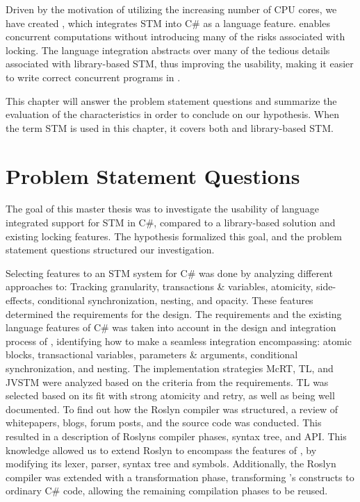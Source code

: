 \makeatletter {}\makeatother
{}
Driven by the motivation of utilizing the increasing number of \ac{CPU} cores, we have created \stmname, which integrates \ac{STM} into C\# as a language feature. \stmname enables concurrent computations without introducing many of the risks associated with locking. The language integration abstracts over many of the tedious details associated with library-based \ac{STM}, thus improving the usability, making it easier to write correct concurrent programs in \stmname.

This chapter will answer the problem statement questions and summarize the evaluation of the characteristics in order to conclude on our hypothesis. When the term \ac{STM} is used in this chapter, it covers both \stmname and library-based \ac{STM}. 

\label{chap:conclusion}

\section{Problem Statement Questions}
The goal of this master thesis was to investigate the usability of language integrated support for \ac{STM} in C\#, compared to a library-based solution and existing locking features. The hypothesis formalized this goal, and the problem statement questions structured our investigation.

Selecting features to an \ac{STM} system for C\# was done by analyzing different approaches to: Tracking granularity, transactions \& variables, atomicity, side-effects, conditional synchronization, nesting, and opacity. These features determined the requirements for the design. The requirements and the existing language features of C\# was taken into account in the design and integration process of \stmname, identifying how to make a seamless integration encompassing: atomic blocks, transactional variables, parameters \& arguments, conditional synchronization, and nesting. The implementation strategies McRT, TL, and JVSTM were analyzed based on the criteria from the requirements. TL was selected based on its fit with strong atomicity and retry, as well as being well documented. To find out how the Roslyn compiler was structured, a review of whitepapers, blogs, forum posts, and the source code was conducted. This resulted in a description of Roslyns compiler phases, syntax tree, and \ac{API}. This knowledge allowed us to extend Roslyn to encompass the features of \stmname, by modifying its lexer, parser, syntax tree and symbols. Additionally, the Roslyn compiler was extended with a transformation phase, transforming \stmname's constructs to ordinary C\# code, allowing the remaining compilation phases to be reused.

